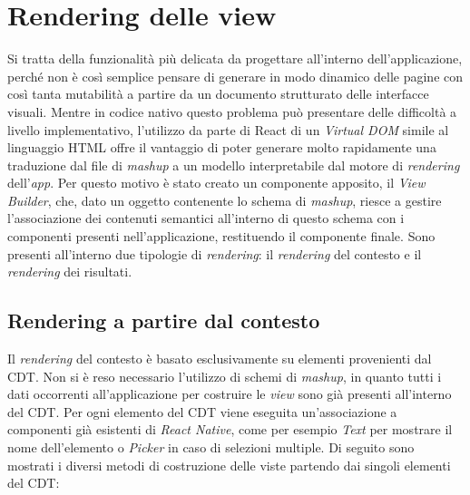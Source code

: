 \section{Rendering delle view}\label{sec:rendering-view}

Si tratta della funzionalità più delicata da progettare all'interno dell'applicazione, perché non è così semplice pensare di generare in modo dinamico delle pagine con così tanta mutabilità a partire da un documento strutturato delle interfacce visuali.
Mentre in codice nativo questo problema può presentare delle difficoltà a livello implementativo, l'utilizzo da parte di React di un \emph{Virtual DOM} simile al linguaggio HTML offre il vantaggio di poter generare molto rapidamente una traduzione dal file di \emph{mashup} a un modello interpretabile dal motore di \emph{rendering} dell'\emph{app}.
Per questo motivo è stato creato un componente apposito, il \emph{View Builder}, che, dato un oggetto contenente lo schema di \emph{mashup}, riesce a gestire l'associazione dei contenuti semantici all'interno di questo schema con i componenti presenti nell'applicazione, restituendo il componente finale.
Sono presenti all'interno due tipologie di \emph{rendering}: il \emph{rendering} del contesto e il \emph{rendering} dei risultati.

\subsection{Rendering a partire dal contesto}

Il \emph{rendering} del contesto è basato esclusivamente su elementi provenienti dal CDT. Non si è reso necessario l'utilizzo di schemi di \textit{mashup}, in quanto tutti i dati occorrenti all'applicazione per costruire le \emph{view} sono già presenti all'interno del CDT. Per ogni elemento del CDT viene eseguita un'associazione a componenti già esistenti di \emph{React Native}, come per esempio \emph{Text} per mostrare il nome dell'elemento o \emph{Picker} in caso di selezioni multiple. Di seguito sono mostrati i diversi metodi di costruzione delle viste partendo dai singoli elementi del CDT:

